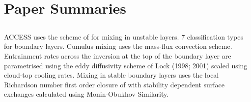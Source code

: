 \documentclass{article}
\begin{document}
\begin{comment}
Note that the Bureau has not yet moved to ensemble forecasting - and probabilistic verification methods are therefore not appropriate. 
\end{comment}

\section{Paper Summaries}

\subsection{\citet{bom10}}
ACCESS uses the scheme of \citet{lock00} for mixing in unstable layers. 7 classification types for boundary layers. Cumulus mixing uses the mass-flux convection scheme. Entrainment rates across the inversion at the top of the boundary layer are parametrised using the eddy diffusivity scheme of Lock (1998; 2001) scaled using cloud-top cooling rates. Mixing in stable boundary layers uses the local Richardson number first order closure of \citet{louis79} with stability dependent surface exchanges calculated using Monin-Obukhov Similarity. 

\subsection{\citet{louis79}}

\subsection{\citet{lock00}}

\subsection{\citet{ecmwf18}}

\subsection{\citet{bishop13}}

\subsection{\citet{basu08}}

\subsection{\citet{kumar06}}
\end{document}
